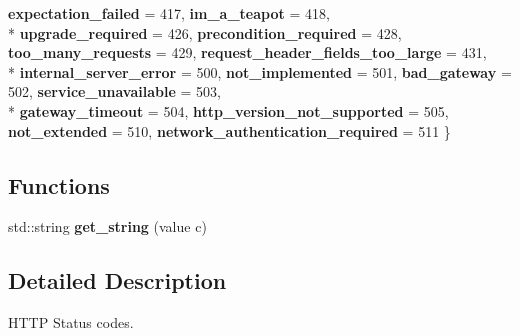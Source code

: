 \begin{DoxyCompactItemize}
{\bfseries expectation\+\_\+failed} = 417, 
{\bfseries im\+\_\+a\+\_\+teapot} = 418, 
\\*
{\bfseries upgrade\+\_\+required} = 426, 
{\bfseries precondition\+\_\+required} = 428, 
{\bfseries too\+\_\+many\+\_\+requests} = 429, 
{\bfseries request\+\_\+header\+\_\+fields\+\_\+too\+\_\+large} = 431, 
\\*
{\bfseries internal\+\_\+server\+\_\+error} = 500, 
{\bfseries not\+\_\+implemented} = 501, 
{\bfseries bad\+\_\+gateway} = 502, 
{\bfseries service\+\_\+unavailable} = 503, 
\\*
{\bfseries gateway\+\_\+timeout} = 504, 
{\bfseries http\+\_\+version\+\_\+not\+\_\+supported} = 505, 
{\bfseries not\+\_\+extended} = 510, 
{\bfseries network\+\_\+authentication\+\_\+required} = 511
 \}\hypertarget{namespacewebsocketpp_1_1http_1_1status__code_ae0d61c309e053ee5673517b54e2886c6}{}\label{namespacewebsocketpp_1_1http_1_1status__code_ae0d61c309e053ee5673517b54e2886c6}

\end{DoxyCompactItemize}
\subsection*{Functions}
\begin{DoxyCompactItemize}
\item 
std\+::string {\bfseries get\+\_\+string} (value c)\hypertarget{namespacewebsocketpp_1_1http_1_1status__code_a883bc82f3dce18b493ba7a5252603ba6}{}\label{namespacewebsocketpp_1_1http_1_1status__code_a883bc82f3dce18b493ba7a5252603ba6}

\end{DoxyCompactItemize}


\subsection{Detailed Description}
H\+T\+TP Status codes. 